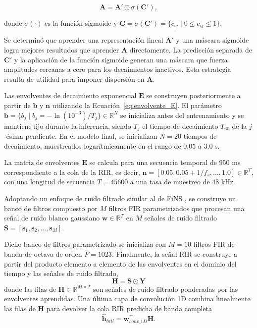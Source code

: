 \begin{equation}
\mathbf{A} = \mathbf{A}' \odot \sigma(\mathbf{C}'),
\end{equation}

donde $\sigma(\cdot)$ es la función sigmoide y $\mathbf{C} = \sigma(\mathbf{C}') = \{c_{ij} \mid 0 \leq c_{ij} \leq 1\}$.

Se determinó que aprender una representación lineal $\mathbf{A}'$ y una máscara sigmoide logra mejores resultados que aprender $\mathbf{A}$ directamente. La predicción separada de $\mathbf{C}'$ y la aplicación de la función sigmoide generan una máscara que fuerza amplitudes cercanas a cero para los decaimientos inactivos. Esta estrategia resulta de utilidad para imponer dispersión en $\mathbf{A}$.

Las envolventes de decaimiento exponencial $\mathbf{E}$ se construyen posteriormente a partir de $\mathbf{b}$ y $\mathbf{n}$ utilizando la Ecuación~\ref{eq:envolvente_E}. El parámetro  $\mathbf{b} = \{b_j \mid b_j = -\ln(10^{-3})/T_j\} \in \mathbb{R}^{N}$ se inicializa antes del entrenamiento y se mantiene fijo durante la inferencia, siendo $T_j$ el tiempo de decaimiento $T_{60}$ de la $j$-ésima pendiente. En el modelo final, se inicializan $N = 20$ tiempos de decaimiento, muestreados logarítmicamente en el rango de $0.05$ a $3.0$ s.

La matriz de envolventes $\mathbf{E}$ se calcula para una secuencia temporal de $950$ ms correspondiente a la cola de la RIR, es decir, $\mathbf{n} = [0.05, 0.05 + 1/f_s, \dots, 1.0] \in \mathbb{R}^{T}$, con una longitud de secuencia $T = 45600$ a una tasa de muestreo de $48$ kHz.

Adoptando un enfoque de ruido filtrado similar al de FiNS \cite{Steinmetz2021FiNS}, se construye un banco de filtros compuesto por $M$ filtros FIR parametrizados que procesan una señal de ruido blanco gaussiano $\mathbf{w} \in \mathbb{R}^{T}$ en $M$ señales de ruido filtrado $\mathbf{S} = [\mathbf{s}_1, \mathbf{s}_2, \dots, \mathbf{s}_M]$. 

Dicho banco de filtros parametrizado se inicializa con $M = 10$ filtros FIR de banda de octava de orden $P = 1023$. Finalmente, la señal RIR se construye a partir del producto elemento a elemento de las envolventes en el dominio del tiempo y las señales de ruido filtrado,
\begin{equation}
\mathbf{H} = \mathbf{S} \odot \mathbf{Y}
\end{equation}
donde las filas de $\mathbf{H} \in \mathbb{R}^{M \times T}$ son señales de ruido filtrado ponderadas por las envolventes aprendidas. Una última capa de convolución 1D combina linealmente las filas de $\mathbf{H}$ para devolver la cola RIR predicha de banda completa 
\begin{equation}
\hat{\mathbf{h}}_{tail} = \mathbf{w}_{conv\_1D}^\intercal \mathbf{H}.
\end{equation}

